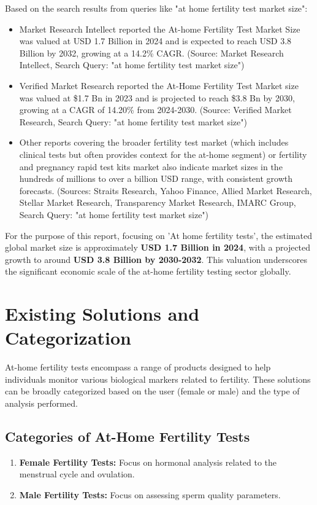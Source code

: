 \documentclass{article}
\begin{document}
Based on the search results from queries like "at home fertility test market size":
\begin{itemize}
    \item Market Research Intellect reported the At-home Fertility Test Market Size was valued at USD 1.7 Billion in 2024 and is expected to reach USD 3.8 Billion by 2032, growing at a 14.2\% CAGR. (Source: Market Research Intellect, Search Query: "at home fertility test market size")
    \item Verified Market Research reported the At-Home Fertility Test Market size was valued at \$1.7 Bn in 2023 and is projected to reach \$3.8 Bn by 2030, growing at a CAGR of 14.20\% from 2024-2030. (Source: Verified Market Research, Search Query: "at home fertility test market size")
    \item Other reports covering the broader fertility test market (which includes clinical tests but often provides context for the at-home segment) or fertility and pregnancy rapid test kits market also indicate market sizes in the hundreds of millions to over a billion USD range, with consistent growth forecasts. (Sources: Straits Research, Yahoo Finance, Allied Market Research, Stellar Market Research, Transparency Market Research, IMARC Group, Search Query: "at home fertility test market size")
\end{itemize}

For the purpose of this report, focusing on 'At home fertility tests', the estimated global market size is approximately \textbf{USD 1.7 Billion in 2024}, with a projected growth to around \textbf{USD 3.8 Billion by 2030-2032}. This valuation underscores the significant economic scale of the at-home fertility testing sector globally.

\section{Existing Solutions and Categorization}

At-home fertility tests encompass a range of products designed to help individuals monitor various biological markers related to fertility. These solutions can be broadly categorized based on the user (female or male) and the type of analysis performed.

\subsection{Categories of At-Home Fertility Tests}
\begin{enumerate}
    \item \textbf{Female Fertility Tests:} Focus on hormonal analysis related to the menstrual cycle and ovulation.
    \item \textbf{Male Fertility Tests:} Focus on assessing sperm quality parameters.
\end{enumerate}
\end{document}
